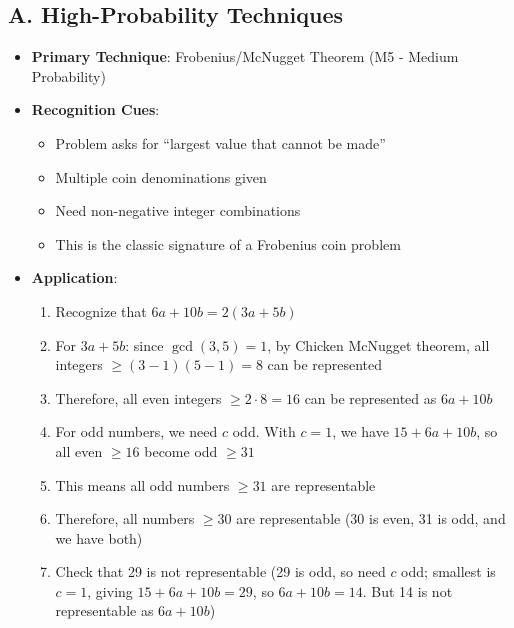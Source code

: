\documentclass[12pt]{article}
\begin{document}
\begin{techniquesbox}
\subsection*{A. High-Probability Techniques}
\begin{itemize}[leftmargin=*]
    \item \textbf{Primary Technique}: Frobenius/McNugget Theorem (M5 - Medium Probability)
    \item \textbf{Recognition Cues}: 
    \begin{itemize}
        \item Problem asks for ``largest value that cannot be made''
        \item Multiple coin denominations given
        \item Need non-negative integer combinations
        \item This is the classic signature of a Frobenius coin problem
    \end{itemize}
    \item \textbf{Application}: 
    \begin{enumerate}
        \item Recognize that $6a + 10b = 2(3a + 5b)$
        \item For $3a + 5b$: since $\gcd(3, 5) = 1$, by Chicken McNugget theorem, all integers $\geq (3-1)(5-1) = 8$ can be represented
        \item Therefore, all even integers $\geq 2 \cdot 8 = 16$ can be represented as $6a + 10b$
        \item For odd numbers, we need $c$ odd. With $c = 1$, we have $15 + 6a + 10b$, so all even $\geq 16$ become odd $\geq 31$
        \item This means all odd numbers $\geq 31$ are representable
        \item Therefore, all numbers $\geq 30$ are representable (30 is even, 31 is odd, and we have both)
        \item Check that 29 is not representable (29 is odd, so need $c$ odd; smallest is $c = 1$, giving $15 + 6a + 10b = 29$, so $6a + 10b = 14$. But 14 is not representable as $6a + 10b$)
    \end{enumerate}
\end{itemize}


\end{techniquesbox}
\end{document}
